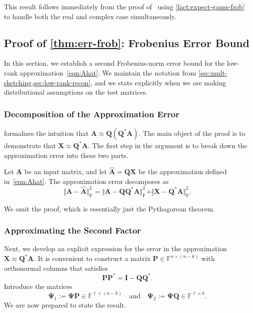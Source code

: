 \documentclass[final]{siamart1116}
\numberwithin{equation}{section}
\numberwithin{theorem}{section}
\numberwithin{figure}{section}
\newcommand{\F}{\mathbb{F}}
\newcommand{\mtx}[1]{\bm{#1}}
\newcommand{\Id}{\mathbf{I}}
\newcommand{\norm}[1]{\Vert #1 \Vert}
\newcommand{\fnorm}[1]{\norm{#1}_{\mathrm{F}}}
\newcommand{\fnormsq}[1]{\fnorm{#1}^2}
\begin{document}
\noindent
This result follows immediately from the
proof of~\cite[Thm.~10.5]{HMT11:Finding-Structure}
using \cref{fact:expect-gauss-frob} to handle both
the real and complex case simultaneously.



\subsection{Proof of \cref{thm:err-frob}: Frobenius Error Bound}
\label{sec:proof-low-rank-recon}

In this section, we establish a second Frobenius-norm error bound
for the low-rank approximation~\cref{eqn:Ahat}.
We maintain the notation from \cref{sec:mult-sketching,sec:low-rank-recon},
and we state explicitly when we are making distributional assumptions
on the test matrices.


\subsubsection{Decomposition of the Approximation Error}

 formalizes the intuition that $\mtx{A} \approx \mtx{Q}(\mtx{Q}^* \mtx{A})$.
The main object of the proof is to demonstrate that $\mtx{X} \approx \mtx{Q}^* \mtx{A}$.
The first step in the argument is to break down the approximation error into these two parts.

\begin{lemma} \label{lem:err-decomp}
Let $\mtx{A}$ be an input matrix, and
let $\hat{\mtx{A}} = \mtx{QX}$ be the approximation defined in~\cref{eqn:Ahat}.
The approximation error decomposes as
$$
\fnormsq{ \mtx{A} - \hat{\mtx{A}} }
	= \fnormsq{ \mtx{A} - \mtx{QQ}^* \mtx{A} } + \fnormsq{ \mtx{X} - \mtx{Q}^*\mtx{A} }.
$$
\end{lemma}

\noindent
We omit the proof, which is essentially just the Pythagorean theorem.



\subsubsection{Approximating the Second Factor}

Next, we develop an explicit expression for the error in
the approximation $\mtx{X} \approx \mtx{Q}^* \mtx{A}$.
It is convenient to
construct a matrix $\mtx{P} \in \F^{n \times (n-k)}$
with orthonormal columns that satisfies
\begin{equation} \label{eqn:def-P}
\mtx{PP}^* = \Id - \mtx{QQ}^*.
\end{equation}
Introduce the matrices
\begin{equation} \label{eqn:Psis}
\mtx{\Psi}_1 := \mtx{\Psi} \mtx{P} \in \F^{\ell \times (n-k)}
\quad\text{and}\quad
\mtx{\Psi}_2 := \mtx{\Psi} \mtx{Q} \in \F^{\ell \times k}.
\end{equation}
We are now prepared to state the result.
\end{document}
